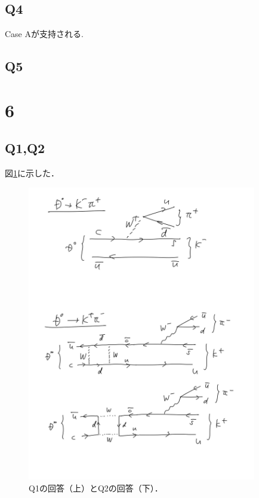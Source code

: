 \documentclass[a4paper,11pt]{jsarticle}
\begin{document}
\subsection*{Q4}
Case Aが支持される.

\subsection*{Q5}

\section*{6}
\subsection*{Q1,Q2}
図\ref{fig:fd}に示した．

\begin{figure}[htbp]
  \centering
  \includegraphics[width=10cm]{report_particle_physics_2022_tanaka-14.jpg}
  \caption{Q1の回答（上）とQ2の回答（下）．}
  \label{fig:fd}
\end{figure}
\end{document}
